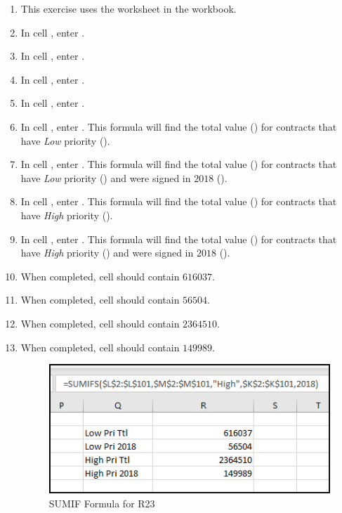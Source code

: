 \begin{enumerate}
	\item This exercise uses the  worksheet in the  workbook.
	\item In cell , enter .
	\item In cell , enter .
	\item In cell , enter .
	\item In cell , enter .
	\item In cell , enter . This formula will find the total value () for contracts that have \textit{Low} priority ().
	\item In cell , enter . This formula will find the total value () for contracts that have \textit{Low} priority () and were signed in $ 2018 $ ().
	\item In cell , enter . This formula will find the total value () for contracts that have \textit{High} priority ().
	\item In cell , enter . This formula will find the total value () for contracts that have \textit{High} priority () and were signed in $ 2018 $ ().
	\item When completed, cell  should contain $ 616037 $.
	\item When completed, cell  should contain $ 56504 $.
	\item When completed, cell  should contain $ 2364510 $.
	\item When completed, cell  should contain $ 149989 $.
	
	\begin{figure}[H]
		\centering
		\includegraphics[width=\maxwidth{.75\linewidth}]{gfx/ch09_fig42}
		\caption{SUMIF Formula for R23}
		\label{09:fig42}
	\end{figure}
	

\end{enumerate}
